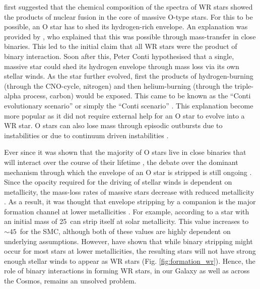 \citet{gamow_wc_1943} first suggested that the chemical composition of the spectra of WR stars showed the products of nuclear fusion in the core of massive O-type stars. For this to be possible, an O star has to shed its hydrogen-rich envelope. An explanation was provided by \citet{paczynski_evolution_1967}, who explained that this was possible through mass-transfer in close binaries. This led to the initial claim that all WR stars were the product of binary interaction. Soon after this, Peter Conti hypothesised that a single, massive star could shed its hydrogen envelope through mass loss via its own stellar winds. As the star further evolved, first the products of hydrogen-burning (through the CNO-cycle, nitrogen) and then helium-burning (through the triple-alpha process, carbon) would be exposed. This came to be known as the ``Conti evolutionary scenario'' or simply the ``Conti scenario'' \citep{1976Conti}. This explanation become more popular as it did not require external help for an O star to evolve into a WR star. O stars can also lose mass through episodic outbursts due to instabilities \citep[e.g.][]{langer_towards_1994} or due to continuum driven instabilities \citep{smith_role_2006}.

Ever since it was shown that the majority of O stars live in close binaries that will interact over the course of their lifetime \citep{sana_binary_2012}, the debate over the dominant mechanism through which the envelope of an O star is stripped is still ongoing \citep{vanbeveren_wr_1998,foellmi_wolf-rayet_2003,shenar_wolf-rayet_2019,neugent_close_2014,shenar_why_2020}. Since the opacity required for the driving of stellar winds is dependent on metallicity, the mass-loss rates of massive stars decrease with reduced metallicity \citep{vink_mass-loss_2001,vink_metallicity_2005,hainich_wolf-rayet_2015,shenar_wolf-rayet_2019}. As a result, it was thought that envelope stripping by a companion is the major formation channel at lower metallicities \citep{maeder_new_1994,smith_mass_2014,groh_grids_2019}. For example, according to \citet{meynet_stellar_2003,meynet_stellar_2005} a star with an initial mass of 25\,\Msun{} can strip itself at solar metallicity. This value increases to ${\sim}45\,$\Msun{} for the SMC, although both of these values are highly dependent on underlying assumptions. However, \citet{shenar_why_2020} have shown that while binary stripping might occur for most stars at lower metallicities, the resulting stars will not have strong enough stellar winds to appear as WR stars (Fig. \ref{fig:formation_wr}). Hence, the role of binary interactions in forming WR stars, in our Galaxy as well as across the Cosmos, remains an unsolved problem.

